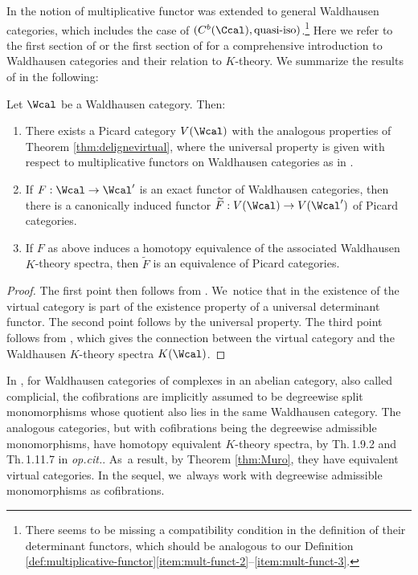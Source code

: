 In \cite{Muro:determinant} the notion of multiplicative functor was extended to general Waldhausen categories, which includes the case of $(C^b(\Ccal), \hbox{quasi-iso})$.\footnote{There seems to be missing a compatibility condition in the definition of their determinant functors, which should be analogous to our Definition \ref{def:multiplicative-functor}\eqref{item:mult-funct-2}--\eqref{item:mult-funct-3}.} Here we refer to the first section of \cite{Waldhausen} or the first section of \cite{ThomasonTrobaugh} for a comprehensive introduction to Waldhausen categories and their relation to $K$-theory. We summarize the results of \cite{Muro:determinant} in the following:
\begin{theorem}\label{thm:Muro}
Let $\Wcal$ be a Waldhausen category. Then:
\begin{enumerate}
\item\label{item:Muro-1} There exists a Picard category $V(\Wcal)$ with the analogous properties of Theorem \ref{thm:delignevirtual}, where the universal property is given with respect to multiplicative functors on Waldhausen categories as in \cite[Def.\,1.2.3]{Muro:determinant}.
\item\label{item:Muro-2} If $F: \Wcal \to \Wcal'$ is an exact functor of Waldhausen categories, then there is a canonically induced functor $\widetilde{F}: V(\Wcal) \to V(\Wcal')$ of Picard categories.
\item\label{item:Muro-3} If $F$ as above induces a homotopy equivalence of the associated Waldhausen $K$-theory spectra, then $\widetilde{F}$ is an equivalence of Picard categories.
\end{enumerate}
\end{theorem}
\begin{proof}
The first point then follows from \cite[Th.\,4.3.4, Th.\,4.4.2, Cor.\,4.4.5]{Muro:determinant}. We~notice that in \loccit the existence of the virtual category is part of the existence property of a universal determinant functor. The second point follows by the universal property. The third point follows from \cite[Th.\,4.5.2]{Muro:determinant}, which gives the connection between the virtual category and the Waldhausen $K$-theory spectra $K(\Wcal)$.
\end{proof}

In \cite{ThomasonTrobaugh}, for Waldhausen categories of complexes in an abelian category, also called complicial, the cofibrations are implicitly assumed to be degreewise split monomorphisms whose quotient also lies in the same Waldhausen category. The analogous categories, but with cofibrations being the degreewise admissible monomorphisms, have homotopy equivalent $K$-theory spectra, by Th.\,1.9.2 and Th.\,1.11.7 in \emph{op.cit.}. As~a result, by Theorem \ref{thm:Muro}, they have equivalent virtual categories. In the sequel, we~always work with degreewise admissible monomorphisms as cofibrations.

